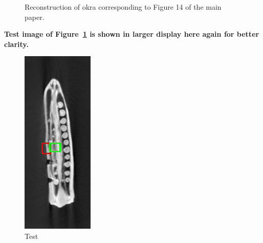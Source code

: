 \documentclass{article}
\begin{document}
\begin{figure}[!h]
\caption{Reconstruction of okra corresponding to Figure 14 of the main paper.}
\label{fig:okra_3D_results_biggerIm}
\end{figure}
\newpage
\textbf{Test image of Figure~\ref{fig:okra_3D_results_biggerIm}  is shown in larger display here  again for better clarity.}
\begin{figure}[!h]
\centering
       \includegraphics[width=0.5\columnwidth]{../images/okra/testCropped.png}
\captionsetup{labelformat=empty}
        \caption{\large{Test}}
\end{figure}
\newpage
\end{document}
